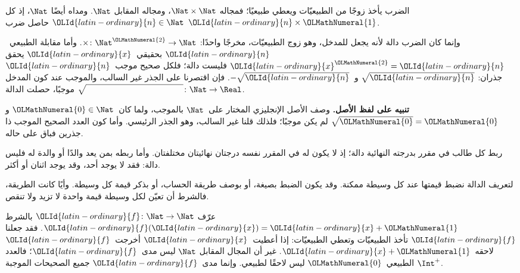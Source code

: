 \documentclass[../../../include/open-logic-section]{subfiles}
\begin{document}
\begin{ex}
الضرب يأخذ زوجًا من الطبيعيّات ويعطي طبيعيًا؛ فمجاله
$\Nat \times \Nat$، ومجاله المقابل $\Nat$. ومداه أيضًا $\Nat$،
إذ كل $\OLId{latin-ordinary}{n} \in \Nat$ حاصل ضرب $\OLId{latin-ordinary}{n} \times \OLMathNumeral{1}$.
\end{ex}

\begin{ex}
وإنما كان الضرب دالة لأنه يجعل للمدخل، وهو زوج الطبيعيّات،
مخرجًا واحدًا: $\times \colon \Nat^\OLMathNumeral{2} \to \Nat$.
وأما مقابلة الطبيعي~$\OLId{latin-ordinary}{n}$ بحقيقي~$\OLId{latin-ordinary}{x}$ يحقق $\OLId{latin-ordinary}{x}^\OLMathNumeral{2} = \OLId{latin-ordinary}{n}$ فليست دالة؛
فلكل صحيح موجب~$\OLId{latin-ordinary}{n}$ جذران: $\sqrt{\OLId{latin-ordinary}{n}}$ و~$-\sqrt{\OLId{latin-ordinary}{n}}$.
فإن اقتصرنا على الجذر غير السالب، والموجب عند كون المدخل موجبًا،
حصلت الدالة $\sqrt{\phantom{\OLId{latin-looped}{X}}} \colon \Nat \to \Real$.
\end{ex}

\begin{explain}
\textbf{تنبيه على لفظ الأصل.} وصف الأصل الإنجليزي المختار على~$\Nat$
بالموجب، ولما كان~$\OLMathNumeral{0}\in\Nat$ و$\sqrt{\OLMathNumeral{0}}=\OLMathNumeral{0}$ لم يكن موجبًا؛ فلذلك قلنا غير السالب، وهو الجذر
الرئيسي. وأما كون العدد الصحيح الموجب ذا جذرين فباق على حاله.
\end{explain}

\begin{ex}
ربط كل طالب في مقرر بدرجته النهائية دالة؛ إذ لا يكون له في المقرر
نفسه درجتان نهائيتان مختلفتان. وأما ربطه بمن يعد والدًا أو والدة
له فليس دالة: فقد لا يوجد أحد، وقد يوجد اثنان أو أكثر.
\end{ex}

\begin{explain}
لتعريف الدالة نضبط قيمتها عند كل وسيطة ممكنة. وقد يكون الضبط بصيغة،
أو بوصف طريقة الحساب، أو بذكر قيمة كل وسيطة. وأيًا كانت الطريقة،
فالشرط أن تعيّن لكل وسيطة قيمة واحدة لا تزيد ولا تنقص.
\end{explain}

\begin{ex}
عرّف $\OLId{latin-ordinary}{f} \colon \Nat \to \Nat$ بالشرط $\OLId{latin-ordinary}{f}(\OLId{latin-ordinary}{x}) = \OLId{latin-ordinary}{x}+\OLMathNumeral{1}$.
فقد جعلنا $\OLId{latin-ordinary}{f}$ تأخذ الطبيعيّات وتعطي الطبيعيّات: إذا أعطيت~$\OLId{latin-ordinary}{x}$
أخرجت~$\OLId{latin-ordinary}{f}$ لاحقه~$\OLId{latin-ordinary}{x}+\OLMathNumeral{1}$. غير أن المجال المقابل $\Nat$ ليس
مدى~$\OLId{latin-ordinary}{f}$؛ فالعدد الطبيعي~$\OLMathNumeral{0}$ ليس لاحقًا لطبيعي. وإنما مدى~$\OLId{latin-ordinary}{f}$
جميع الصحيحات الموجبة $\Int^{+}$.
\end{ex}
\end{document}
